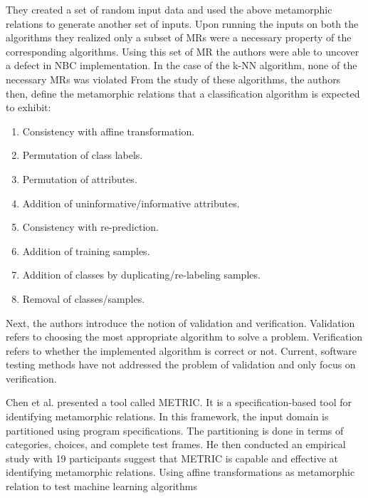 They created a set of random input data and used the above metamorphic relations to generate another set of inputs. Upon running the inputs on both the algorithms they realized only a subset of MRs were a necessary property of the corresponding algorithms. Using this set of MR the authors were able to uncover a defect in NBC implementation. In the case of the k-NN algorithm, none of the necessary MRs was violated
From the study of these algorithms, the authors then, define the metamorphic relations that a classification algorithm is expected to exhibit:
\begin{enumerate}
  \item Consistency with affine transformation.
  \item Permutation of class labels.
  \item Permutation of attributes.
  \item Addition of uninformative/informative attributes.
  \item Consistency with re-prediction.
  \item Addition of training samples.
  \item Addition of classes by duplicating/re-labeling samples.
  \item Removal of classes/samples.
\end{enumerate}
Next, the authors introduce the notion of validation and verification. Validation refers to choosing the most appropriate algorithm to solve a problem. Verification refers to whether the implemented algorithm is correct or not. Current, software testing methods have not addressed the problem of validation and only focus on verification.

Chen et al. \cite{Chen2016} presented a tool called METRIC. It is a specification-based tool for identifying metamorphic relations. In this framework, the input domain is partitioned using program specifications. The partitioning is done in terms of categories, choices, and complete test frames. He then conducted an empirical study with 19 participants suggest that METRIC is capable and effective at identifying metamorphic relations. Using affine transformations as metamorphic relation to test machine learning algorithms

